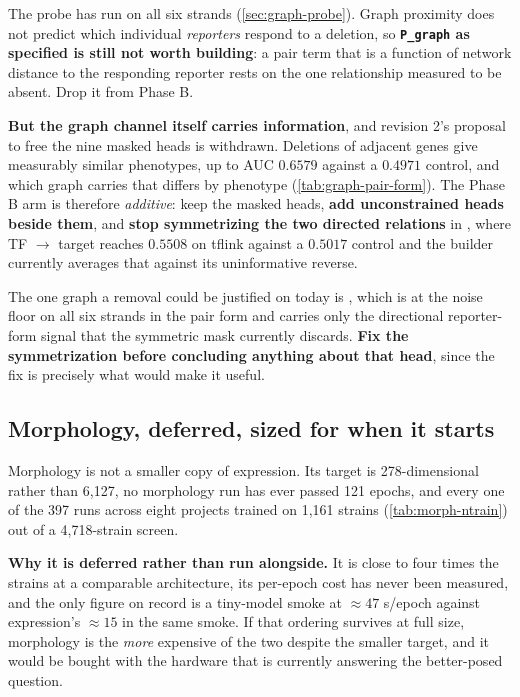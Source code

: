  The probe has run on all six strands (\cref{sec:graph-probe}). Graph proximity does
not predict which individual \emph{reporters} respond to a deletion, so
\textbf{\texttt{P\_graph} as specified is still not worth building}: a pair term that is a
function of network distance to the responding reporter rests on the one relationship
measured to be absent. Drop it from Phase B.

\textbf{But the graph channel itself carries information}, and revision 2's proposal to free
the nine masked heads is withdrawn. Deletions of adjacent genes give measurably similar
phenotypes, up to AUC $0.6579$ against a $0.4971$ control, and which graph carries that
differs by phenotype (\cref{tab:graph-pair-form}). The Phase B arm is therefore
\emph{additive}: keep the masked heads, \textbf{add unconstrained heads beside them}, and
\textbf{stop symmetrizing the two directed relations} in , where
TF $\to$ target reaches $0.5508$ on tflink against a $0.5017$ control and the builder
currently averages that against its uninformative reverse.

The one graph a removal could be justified on today is , which is at the noise
floor on all six strands in the pair form and carries only the directional reporter-form
signal that the symmetric mask currently discards. \textbf{Fix the symmetrization before
concluding anything about that head}, since the fix is precisely what would make it useful.

\subsection{Morphology, deferred, sized for when it starts}

Morphology is not a smaller copy of expression. Its target is 278-dimensional rather than
6,127, no morphology run has ever passed 121 epochs, and every one of the 397 runs across
eight projects trained on 1,161 strains (\cref{tab:morph-ntrain}) out of a 4,718-strain
screen.

\textbf{Why it is deferred rather than run alongside.} It is close to four times the strains
at a comparable architecture, its per-epoch cost has never been measured, and the only figure
on record is a tiny-model smoke at $\approx 47$ s/epoch against expression's $\approx 15$ in
the same smoke. If that ordering survives at full size, morphology is the \emph{more}
expensive of the two despite the smaller target, and it would be bought with the hardware
that is currently answering the better-posed question.

